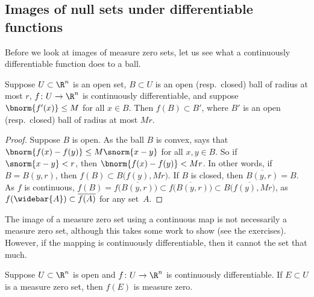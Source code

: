 \subsection{Images of null sets under differentiable functions}

Before we look at images of measure zero sets, let us see what a
continuously differentiable function does to a ball.

\begin{lemma} \label{lemma:ballmapder}
Suppose $U \subset \R^n$ is an open set,
$B \subset U$ is an open (resp.\ closed) ball of radius at most $r$,
$f \colon U \to \R^n$ is continuously
differentiable, and suppose $\bnorm{f'(x)} \leq M$ for all $x \in B$.
Then $f(B) \subset B'$, where $B'$ is an open (resp.\ closed) ball of radius at most $Mr$.
\end{lemma}

\begin{proof}
Suppose $B$ is open.
As the ball $B$ is convex,
 says that $\bnorm{f(x)-f(y)} \leq M \snorm{x-y}$ for
all $x,y \in B$.
So if $\snorm{x-y} < r$, then $\bnorm{f(x)-f(y)} < Mr$.
In other words, if
$B=B(y,r)$, then $f(B) \subset B\bigl(f(y),M r \bigr)$.
If $B$ is closed, then $\overline{B(y,r)} = B$.
As $f$ is continuous,
$f(B) = f\bigl(\overline{B(y,r)}\bigr) \subset
\overline{f\bigl(B(y,r)\bigr)} \subset \overline{B\bigl(f(y),M r
\bigr)}$, as $f(\widebar{A}) \subset \overline{f(A)}$ for any set~$A$.
\end{proof}

The image of a measure zero set using a continuous map is not necessarily
a measure zero set, although this takes some work to show (see the exercises).
However, if the mapping is continuously
differentiable, then it cannot  the set that much.

\begin{prop} \label{prop:imagenull}
Suppose $U \subset \R^n$ is open and $f \colon U \to \R^n$
is continuously differentiable.  If $E \subset U$ is a 
measure zero set, then $f(E)$ is measure zero.
\end{prop}

